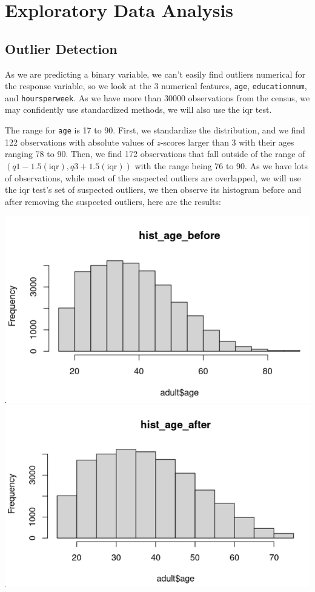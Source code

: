 \documentclass{article}
\begin{document}
\section{Exploratory Data Analysis}
    \subsection{Outlier Detection}
    \hspace{\parindent} 

    As we are predicting a binary variable, we can't easily find outliers numerical for the response variable, so we look at the 3 numerical features, \texttt{age}, \texttt{educationnum}, and \texttt{hoursperweek}. As we have more than 30000 observations from the census, we may confidently use standardized methods, we will also use the iqr test.
    
    The range for \texttt{age} is 17 to 90. First, we standardize the distribution, and we find 122 observations with absolute values of $z$-scores larger than 3 with their ages ranging 78 to 90. Then, we find 172 observations that fall outside of the range of $(q1-1.5(\text{iqr}), q3+1.5(\text{iqr}))$ with the range being 76 to 90. As we have lots of observations, while most of the suspected outliers are overlapped, we will use the iqr test's set of suspected outliers, we then observe its histogram before and after removing the suspected outliers, here are the results:
    \begin{center}
    \includegraphics[scale = 0.3]{hist_age_before.png}
    \includegraphics[scale = 0.3]{hist_age_after.png}
    \end{center}
    
\end{document}
